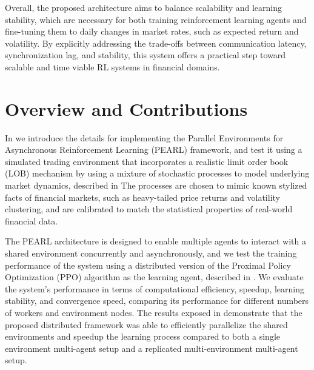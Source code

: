 Overall, the proposed architecture aims to balance scalability and learning stability,
which are necessary for both training reinforcement learning agents and fine-tuning them to daily changes
in market rates, such as expected return and volatility.
By explicitly addressing the trade-offs between communication latency, synchronization lag, and stability,
this system offers a practical step toward scalable and time viable RL systems in financial domains.

\section{Overview and Contributions}
\label{sec:overview}

In  we introduce the details for implementing the Parallel Environments for Asynchronous Reinforcement Learning (PEARL) framework,
and test it using a simulated trading environment that incorporates a realistic limit order book (LOB) mechanism
by using a mixture of stochastic processes to model underlying market dynamics, described in 
The processes are chosen to mimic known stylized facts of financial markets, such as heavy-tailed price returns and
volatility clustering, and are calibrated to match the statistical properties of real-world financial data.

The PEARL architecture is designed to enable multiple agents to interact with a shared environment concurrently and asynchronously,
and we test the training performance of the system using a distributed version of the Proximal Policy Optimization (PPO) algorithm
as the learning agent, described in .
We evaluate the system's performance in terms of computational efficiency, speedup, learning stability, and convergence speed,
comparing its performance for different numbers of workers and environment nodes.
The results exposed in  demonstrate that the proposed distributed framework
was able to efficiently parallelize the shared environments and speedup the learning process compared to both a single environment 
multi-agent setup and a replicated multi-environment multi-agent setup.
